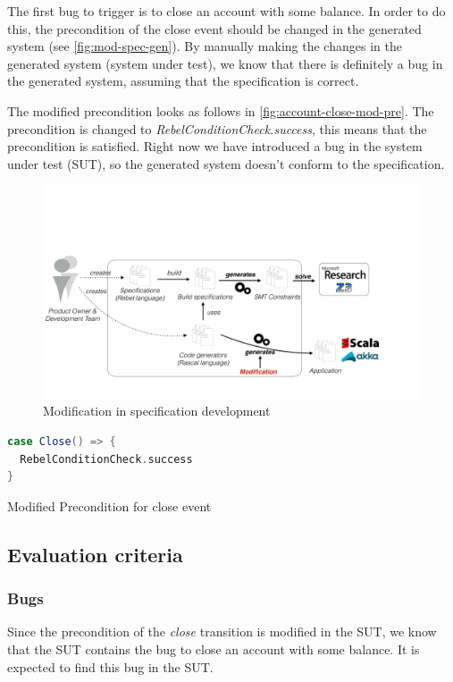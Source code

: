 The first bug to trigger is to close an account with some balance. In order to do this, the precondition of the close event should be changed in the generated system (see \autoref{fig:mod-spec-gen}). By manually making the changes in the generated system (system under test), we know that there is definitely a bug in the generated system, assuming that the specification is correct.

The modified precondition looks as follows in
\autoref{fig:account-close-mod-pre}. The precondition is changed to
\textit{RebelConditionCheck.success}, this means that the precondition is
satisfied. Right now we have introduced a bug in the system under test (SUT),
so the generated system doesn't conform to the specification.

\begin{figure}[h!]
  \centering
  \includegraphics[width=\linewidth{}]{figures/mod-generated.pdf}
  \caption{Modification in specification development}\label{fig:mod-spec-gen}
\end{figure}
\FloatBarrier

\begin{sourcecode}[h!]
\begin{lstlisting}[language=scala]
case Close() => {
  RebelConditionCheck.success
}
\end{lstlisting}
\caption{Modified Precondition for close event}\label{fig:account-close-mod-pre}
\end{sourcecode}
\FloatBarrier

\subsection{Evaluation criteria}\label{sec:ch4-eval-criteria}

\subsubsection{Bugs}
Since the precondition of the \textit{close} transition is modified in the SUT,
we know that the SUT contains the bug to close an account with some balance. It
is expected to find this bug in the SUT.

